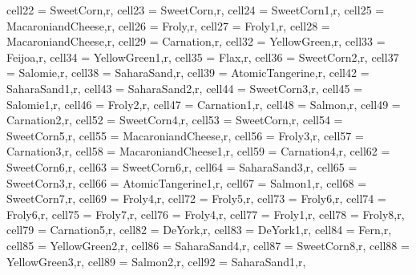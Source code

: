 \begin{table}[H]
	\centering
	\begin{adjustbox}{width=\textwidth}
		\begin{tblr}{
				cell{2}{2} = {SweetCorn,r},
				cell{2}{3} = {SweetCorn,r},
				cell{2}{4} = {SweetCorn1,r},
				cell{2}{5} = {MacaroniandCheese,r},
				cell{2}{6} = {Froly,r},
				cell{2}{7} = {Froly1,r},
				cell{2}{8} = {MacaroniandCheese,r},
				cell{2}{9} = {Carnation,r},
				cell{3}{2} = {YellowGreen,r},
				cell{3}{3} = {Feijoa,r},
				cell{3}{4} = {YellowGreen1,r},
				cell{3}{5} = {Flax,r},
				cell{3}{6} = {SweetCorn2,r},
				cell{3}{7} = {Salomie,r},
				cell{3}{8} = {SaharaSand,r},
				cell{3}{9} = {AtomicTangerine,r},
				cell{4}{2} = {SaharaSand1,r},
				cell{4}{3} = {SaharaSand2,r},
				cell{4}{4} = {SweetCorn3,r},
				cell{4}{5} = {Salomie1,r},
				cell{4}{6} = {Froly2,r},
				cell{4}{7} = {Carnation1,r},
				cell{4}{8} = {Salmon,r},
				cell{4}{9} = {Carnation2,r},
				cell{5}{2} = {SweetCorn4,r},
				cell{5}{3} = {SweetCorn,r},
				cell{5}{4} = {SweetCorn5,r},
				cell{5}{5} = {MacaroniandCheese,r},
				cell{5}{6} = {Froly3,r},
				cell{5}{7} = {Carnation3,r},
				cell{5}{8} = {MacaroniandCheese1,r},
				cell{5}{9} = {Carnation4,r},
				cell{6}{2} = {SweetCorn6,r},
				cell{6}{3} = {SweetCorn6,r},
				cell{6}{4} = {SaharaSand3,r},
				cell{6}{5} = {SweetCorn3,r},
				cell{6}{6} = {AtomicTangerine1,r},
				cell{6}{7} = {Salmon1,r},
				cell{6}{8} = {SweetCorn7,r},
				cell{6}{9} = {Froly4,r},
				cell{7}{2} = {Froly5,r},
				cell{7}{3} = {Froly6,r},
				cell{7}{4} = {Froly6,r},
				cell{7}{5} = {Froly7,r},
				cell{7}{6} = {Froly4,r},
				cell{7}{7} = {Froly1,r},
				cell{7}{8} = {Froly8,r},
				cell{7}{9} = {Carnation5,r},
				cell{8}{2} = {DeYork,r},
				cell{8}{3} = {DeYork1,r},
				cell{8}{4} = {Fern,r},
				cell{8}{5} = {YellowGreen2,r},
				cell{8}{6} = {SaharaSand4,r},
				cell{8}{7} = {SweetCorn8,r},
				cell{8}{8} = {YellowGreen3,r},
				cell{8}{9} = {Salmon2,r},
				cell{9}{2} = {SaharaSand1,r},
}
\end{tblr}
\end{adjustbox}
\end{table}
